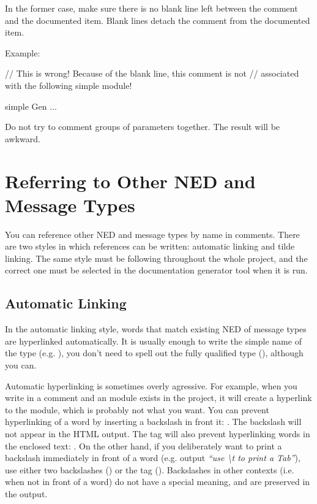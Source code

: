 In the former case, make sure there is no blank line left
between the comment and the documented item. Blank lines
detach the comment from the documented item.

Example:
\begin{ned}
// This is wrong! Because of the blank line, this comment is not
// associated with the following simple module!

simple Gen
{
    ...
}
\end{ned}

Do not try to comment groups of parameters together. The result
will be awkward.

\section{Referring to Other NED and Message Types}

You can reference other NED and message types by name in comments. There
are two styles in which references can be written: automatic linking and
tilde linking. The same style must be following throughout the whole
project, and the correct one must be selected in the documentation
generator tool when it is run.

\subsection{Automatic Linking}

In the automatic linking style, words that match existing NED of message
types are hyperlinked automatically. It is usually enough to write the
simple name of the type (e.g. ), you don't need to spell out the
fully qualified type (), although you can.

Automatic hyperlinking is sometimes overly agressive. For example, when you
write  in a comment and an  module exists
in the project, it will create a hyperlink to the module, which is probably
not what you want. You can prevent hyperlinking of a word by inserting a
backslash in front it: . The backslash will
not appear in the HTML output. The  tag will also prevent
hyperlinking words in the enclosed text: .
On the other hand, if you deliberately want to print a backslash immediately
in front of a word (e.g. output \textit{``use {\textbackslash}t to print a Tab''}),
use either two backslashes () or the
 tag ().
Backslashes in other contexts (i.e. when not in front of a word) do not have
a special meaning, and are preserved in the output.

